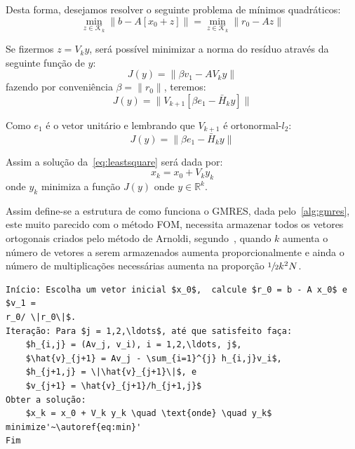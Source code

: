 \documentclass[
	12pt,				  %
	openright,		%
	twoside,			%
	a4paper,			%
	chapter=TITLE,		    %
	english,			%
	brazil				%
	]{abntex2}
\begin{document}
Desta forma, desejamos resolver o seguinte problema de mínimos quadráticos:
\begin{equation}
    \min_{z\in\mathcal{K}_k} \|b - A [x_0 + z] \| = \min_{z\in\mathcal{K}_k}
    \|r_0 - A z \|
    \label{eq:leastsquare}
\end{equation}

Se fizermos $z = V_k y$, será possível minimizar a norma do resíduo através da
seguinte função de $y$:
\begin{equation}
    J(y) = \| \beta v_1 - A V_k y \|
\end{equation}
fazendo por conveniência $\beta = \|r_0\|$, teremos:
\begin{equation}
    J(y) = \| V_{k+1} [\beta e_1 - \bar{H}_k y ] \|
\end{equation}

Como $e_1$ é o vetor unitário e lembrando que $V_{k+1}$ é ortonormal-$l_2$:
\begin{equation}
    J(y) = \| \beta e_1 - \bar{H}_k y \|
    \label{eq:min}
\end{equation}

Assim a solução da~\autoref{eq:leastsquare} será dada por:
\begin{equation}
    x_k = x_0 + V_k y_k
\end{equation}
onde $y_k$ minimiza a função $J(y)$ onde $y \in \mathbb{R}^k$.

Assim define-se a estrutura de como funciona o GMRES, dada
pelo~\autoref{alg:gmres}, este muito parecido com o método FOM, necessita
armazenar todos os vetores ortogonais criados pelo método de Arnoldi,
segundo~, quando $k$ aumenta o número de vetores a serem
armazenados aumenta proporcionalmente e ainda o número de multiplicações
necessárias aumenta na proporção $\sfrac{1}{2}k^2 N$. 

\begin{lstlisting}[caption = Generalized Minimal Residual, fontadjust,
label= alg:gmres, escapechar=']
Início: Escolha um vetor inicial $x_0$,  calcule $r_0 = b - A x_0$ e $v_1 =
r_0/ \|r_0\|$.
Iteração: Para $j = 1,2,\ldots$, até que satisfeito faça:
    $h_{i,j} = (Av_j, v_i), i = 1,2,\ldots, j$,
    $\hat{v}_{j+1} = Av_j - \sum_{i=1}^{j} h_{i,j}v_i$,
    $h_{j+1,j} = \|\hat{v}_{j+1}\|$, e
    $v_{j+1} = \hat{v}_{j+1}/h_{j+1,j}$
Obter a solução:
    $x_k = x_0 + V_k y_k \quad \text{onde} \quad y_k$ minimize'~\autoref{eq:min}'
Fim
\end{lstlisting}
\end{document}
